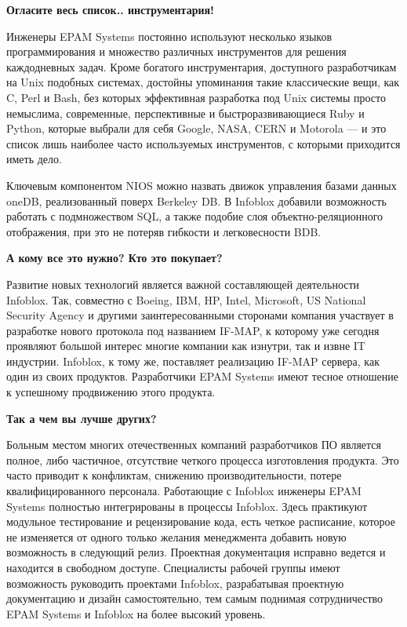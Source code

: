 \documentclass[10pt, a5paper]{article}
\begin{document}
\textbf{Огласите весь список.. инструментария!}

Инженеры EPAM Systems постоянно используют несколько языков программирования и множество 
различных инструментов для решения каждодневных задач. Кроме богатого инструментария, 
доступного разработчикам на Unix подобных системах, достойны упоминания такие 
классические вещи, как C, Perl и Bash, без которых эффективная разработка под Unix системы 
просто немыслима, современные, перспективные и быстроразвивающиеся Ruby и Python, 
которые выбрали для себя Google, NASA, CERN и Motorola — и это список лишь наиболее 
часто используемых инструментов, с которыми приходится иметь дело.

Ключевым компонентом NIOS можно назвать движок управления базами данных oneDB, 
реализованный поверх Berkeley DB. В Infoblox добавили возможность работать с 
подмножеством SQL, а также подобие слоя объектно-реляционного отображения, при это не 
потеряв гибкости и легковесности BDB.

\textbf{А кому все это нужно? Кто это покупает?}

Развитие новых технологий является важной составляющей деятельности Infoblox.  Так, 
совместно с Boeing, IBM, HP, Intel, \linebreak Microsoft, US National Security Agency и другими заинтересованными сторонами компания участвует в разработке нового протокола под 
названием IF-MAP, к которому уже сегодня проявляют большой интерес многие компании 
как изнутри, так и извне IT индустрии. Infoblox, к тому же, поставляет реализацию IF-MAP сервера, как один из своих продуктов. Разработчики EPAM Systems имеют тесное отношение к успешному продвижению этого продукта.

\textbf{Так а чем вы лучше других?}

Больным местом многих отечественных компаний разработчиков ПО является полное, либо 
частичное, отсутствие четкого процесса изготовления продукта. Это часто приводит к 
конфликтам, снижению производительности, потере квалифицированного персонала. 
Работающие с Infoblox инженеры EPAM Systems полностью интегрированы в процессы Infoblox. 
Здесь практикуют модульное тестирование и рецензирование кода, есть четкое расписание, 
которое не изменяется от одного только желания менеджмента добавить новую возможность 
в следующий релиз. Проектная документация исправно ведется и находится в свободном 
доступе. Специалисты рабочей группы имеют возможность руководить проектами Infoblox, разрабатывая проектную документацию и дизайн самостоятельно, тем самым поднимая сотрудничество EPAM Systems и Infoblox на более высокий уровень.
\end{document}
